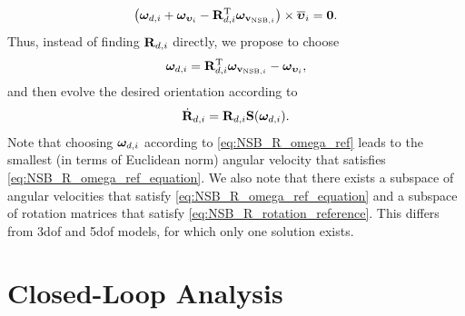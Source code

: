 \begin{equation}
    \left( \bm{\omega}_{d, i} + \bm{\omega}_{\bm{\upsilon}_{i}} 
    - \mathbf{R}_{d, i}^{\mathrm{T}} \bm{\omega}_{\mathbf{v}_{{\rm NSB}, i}} \right) \times \overline{\bm{\upsilon}}_{i} = \mathbf{0}. \label{eq:NSB_R_omega_ref_equation}
\end{equation}
Thus, instead of finding $\mathbf{R}_{d, i}$ directly, we propose to choose 
\begin{equation}
    \bm{\omega}_{d, i} = \mathbf{R}_{d, i}^{\mathrm{T}} \bm{\omega}_{\mathbf{v}_{{\rm NSB}, i}} - \bm{\omega}_{\bm{\upsilon}_{i}},
    \label{eq:NSB_R_omega_ref}
\end{equation}
and then evolve the desired orientation according to 
\begin{equation}
    \dot{\mathbf{R}}_{d, i} = \mathbf{R}_{d, i} \mathbf{S}(\bm{\omega}_{d, i}).
\end{equation}
Note that choosing $\bm{\omega}_{d, i}$ according to \eqref{eq:NSB_R_omega_ref} leads to the smallest (in terms of Euclidean norm) angular velocity that satisfies \eqref{eq:NSB_R_omega_ref_equation}.
We also note that there exists a subspace of angular velocities that satisfy \eqref{eq:NSB_R_omega_ref_equation} and a subspace of rotation matrices that satisfy \eqref{eq:NSB_R_rotation_reference}.
This differs from 3\gls{dof} \cite{eek_formation_2021,arrichiello_formation_2006} and 5\gls{dof} \cite{matouvs_formation_2022} models, for which only one solution exists.


\section{Closed-Loop Analysis}
\label{sec:NSB_R_path_stability}

